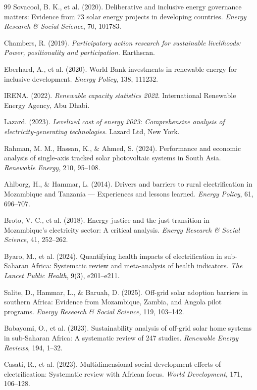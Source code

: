 \documentclass[12pt, a4paper]{article}
\begin{document}
{{{{{{{{{{{{\begin{thebibliography}{99}
 Sovacool, B. K., et al. (2020). Deliberative and inclusive energy governance matters: Evidence from 73 solar energy projects in developing countries. \textit{Energy Research \& Social Science}, 70, 101783.

 Chambers, R. (2019). \textit{Participatory action research for sustainable livelihoods: Power, positionality and participation}. Earthscan.

 Eberhard, A., et al. (2020). World Bank investments in renewable energy for inclusive development. \textit{Energy Policy}, 138, 111232.

 IRENA. (2022). \textit{Renewable capacity statistics 2022}. International Renewable Energy Agency, Abu Dhabi.

 Lazard. (2023). \textit{Levelized cost of energy 2023: Comprehensive analysis of electricity-generating technologies}. Lazard Ltd, New York.

 Rahman, M. M., Hassan, K., & Ahmed, S. (2024). Performance and economic analysis of single-axis tracked solar photovoltaic systems in South Asia. \textit{Renewable Energy}, 210, 95--108.

 Ahlborg, H., & Hammar, L. (2014). Drivers and barriers to rural electrification in Mozambique and Tanzania — Experiences and lessons learned. \textit{Energy Policy}, 61, 696--707.

 Broto, V. C., et al. (2018). Energy justice and the just transition in Mozambique's electricity sector: A critical analysis. \textit{Energy Research \& Social Science}, 41, 252--262.

 Byaro, M., et al. (2024). Quantifying health impacts of electrification in sub-Saharan Africa: Systematic review and meta-analysis of health indicators. \textit{The Lancet Public Health}, 9(3), e201--e211.

 Salite, D., Hammar, L., \& Baruah, D. (2025). Off-grid solar adoption barriers in southern Africa: Evidence from Mozambique, Zambia, and Angola pilot programs. \textit{Energy Research \& Social Science}, 119, 103--142.

 Babayomi, O., et al. (2023). Sustainability analysis of off-grid solar home systems in sub-Saharan Africa: A systematic review of 247 studies. \textit{Renewable Energy Reviews}, 194, 1--32.

 Casati, R., et al. (2023). Multidimensional social development effects of electrification: Systematic review with African focus. \textit{World Development}, 171, 106--128.


\end{thebibliography}}}}}}}}}}}}}
\end{document}
